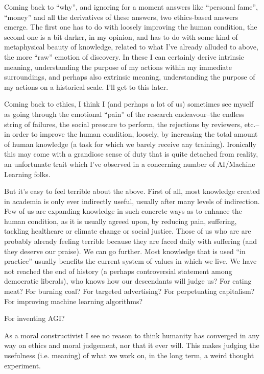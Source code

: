 Coming back to “why”, and ignoring for a moment answers like “personal fame”, “money” and all the derivatives of these answers, two ethics-based answers emerge. The first one has to do with loosely improving the human condition, the second one is a bit darker, in my opinion, and has to do with some kind of metaphysical beauty of knowledge, related to what I’ve already alluded to above, the more “raw” emotion of discovery. In these I can certainly derive intrinsic meaning, understanding the purpose of my actions within my immediate surroundings, and perhaps also extrinsic meaning, understanding the purpose of my actions on a historical scale. I’ll get to this later.

Coming back to ethics, I think I (and perhaps a lot of us) sometimes see myself as going through the emotional “pain” of the research endeavour--the endless string of failures, the social pressure to perform, the rejections by reviewers, etc.--in order to improve the human condition, loosely, by increasing the total amount of human knowledge (a task for which we barely receive any training). Ironically this may come with a grandiose sense of duty that is quite detached from reality, an unfortunate trait which I’ve observed in a concerning number of  AI/Machine Learning folks.

But it’s easy to feel terrible about the above. First of all, most knowledge created in academia is only ever indirectly useful, usually after many levels of indirection. Few of us are expanding knowledge in such concrete ways as to enhance the human condition, as it is usually agreed upon, by reducing pain, suffering, tackling healthcare or climate change or social justice. Those of us who are are probably already feeling terrible because they are faced daily with suffering (and they deserve our praise). We can go further. Most knowledge that is used “in practice” usually benefits the current system of values in which we live. We have not reached the end of history (a perhaps controversial statement among democratic liberals), who knows how our descendants will judge us? For eating meat? For burning coal? For targeted advertising? For perpetuating capitalism? For improving machine learning algorithms?

For inventing AGI? 

As a moral constructivist I see no reason to think humanity has converged in any way on ethics and moral judgement, nor that it ever will. This makes judging the usefulness (i.e. meaning) of what we work on, in the long term, a weird thought experiment.

